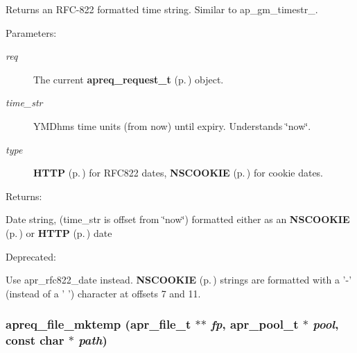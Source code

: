 Returns an RFC-822 formatted time string. Similar to ap\_\-gm\_\-timestr\_.\begin{Desc}
\item[Parameters: ]\par
\begin{description}
\item[{\em 
req}]The current {\bf apreq\_\-request\_\-t} {\rm (p.\,\pageref{structapreq__request__t})} object. \item[{\em 
time\_\-str}]YMDhms time units (from now) until expiry. Understands \char`\"{}now\char`\"{}. \item[{\em 
type}]{\bf HTTP} {\rm (p.\,\pageref{group__Utils_a38a21})} for RFC822 dates, {\bf NSCOOKIE} {\rm (p.\,\pageref{group__Utils_a38a22})} for cookie dates. \end{description}
\end{Desc}
\begin{Desc}
\item[Returns: ]\par
Date string, (time\_\-str is offset from \char`\"{}now\char`\"{}) formatted either as an {\bf NSCOOKIE} {\rm (p.\,\pageref{group__Utils_a38a22})} or {\bf HTTP} {\rm (p.\,\pageref{group__Utils_a38a21})} date \end{Desc}
\begin{Desc}
\item[Deprecated: ]\par
Use apr\_\-rfc822\_\-date instead. {\bf NSCOOKIE} {\rm (p.\,\pageref{group__Utils_a38a22})} strings are formatted with a '-' (instead of a ' ') character at offsets 7 and 11. \end{Desc}
\subsubsection{ apreq\_\-file\_\-mktemp ({\bf apr\_\-file\_\-t} $\ast$$\ast$ {\em fp}, {\bf apr\_\-pool\_\-t} $\ast$ {\em pool}, const char $\ast$ {\em path})}\label{group__Utils_a20}


